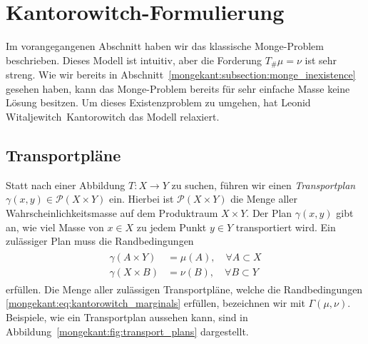 %
%
%
%
\section{Kantorowitch-Formulierung%
\label{mongekant:section:teil2}}

Im vorangegangenen Abschnitt haben wir das klassische Monge-Problem beschrieben.
Dieses Modell ist intuitiv,
aber die Forderung $T_{\#}\mu=\nu$ ist sehr streng.
Wie wir bereits in Abschnitt~\ref{mongekant:subsection:monge_inexistence} gesehen haben,
kann das Monge-Problem bereits für sehr einfache Masse keine Lösung besitzen.
Um dieses Existenzproblem zu umgehen,
hat Leonid Witaljewitch~Kantorowitch das Modell relaxiert.

\subsection{Transportpläne}
Statt nach einer Abbildung $T\colon X\to Y$ zu suchen,
führen wir einen \emph{Transportplan} $\gamma(x,y) \in \mathcal{P}(X \times Y)$ ein.
Hierbei ist $\mathcal{P}(X \times Y)$ die Menge aller Wahrscheinlichkeitsmasse
auf dem Produktraum $X \times Y$.
Der Plan $\gamma(x,y)$ gibt an,
wie viel Masse von $x \in X$ zu jedem Punkt $y \in Y$ transportiert wird.
Ein zulässiger Plan muss die Randbedingungen
\begin{align}
\begin{aligned}
\gamma(A \times Y)
&=
\mu(A)
,\quad \forall A \subset X
\\
\gamma(X \times B)
&=
\nu(B)
,\quad \forall B \subset Y
\end{aligned}
\label{mongekant:eq:kantorowitch_marginals}
\end{align}
erfüllen.
Die Menge aller zulässigen Transportpläne,
welche die Randbedingungen \eqref{mongekant:eq:kantorowitch_marginals} erfüllen,
bezeichnen wir mit $\Gamma(\mu, \nu)$.
Beispiele,
wie ein Transportplan aussehen kann,
sind in Abbildung~\ref{mongekant:fig:transport_plans} dargestellt.

